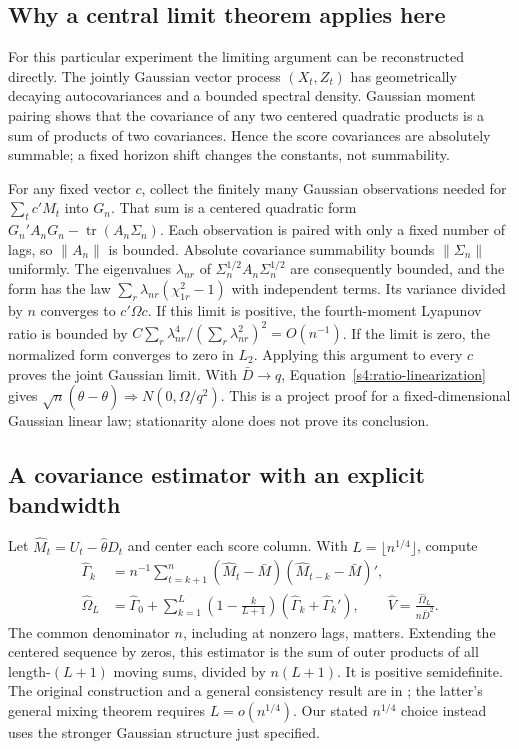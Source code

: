 \subsection{Why a central limit theorem applies here}
For this particular experiment the limiting argument can be reconstructed
directly. The jointly Gaussian vector process $(X_t,Z_t)$ has geometrically
decaying autocovariances and a bounded spectral density. Gaussian moment
pairing shows that the covariance of any two centered quadratic products
is a sum of products of two covariances. Hence the score covariances are
absolutely summable; a fixed horizon shift changes the constants, not
summability.

For any fixed vector $c$, collect the finitely many Gaussian observations
needed for $\sum_tc'M_t$ into $G_n$. That sum is a centered quadratic
form $G_n'A_nG_n-\operatorname{tr}(A_n\Sigma_n)$. Each observation is
paired with only a fixed number of lags, so $\|A_n\|$ is bounded.
Absolute covariance summability bounds $\|\Sigma_n\|$ uniformly. The
eigenvalues $\lambda_{nr}$ of
$\Sigma_n^{1/2}A_n\Sigma_n^{1/2}$ are consequently bounded, and the form
has the law $\sum_r\lambda_{nr}(\chi_{1r}^2-1)$ with independent terms.
Its variance divided by $n$ converges to $c'\Omega c$. If this limit is
positive, the fourth-moment Lyapunov ratio is bounded by
$C\sum_r\lambda_{nr}^4/(\sum_r\lambda_{nr}^2)^2=O(n^{-1})$.
If the limit is zero, the normalized form converges to zero in $L_2$.
Applying this argument to every $c$ proves the joint Gaussian limit.
With $\bar D\to q$, Equation~\eqref{s4:ratio-linearization} gives
$\sqrt n(\widehat\theta-\theta)\Rightarrow N(0,\Omega/q^2)$.
This is a project proof for a fixed-dimensional Gaussian linear law;
stationarity alone does not prove its conclusion.

\subsection{A covariance estimator with an explicit bandwidth}
Let $\widehat M_t=U_t-\widehat\theta D_t$ and center each score column.
With $L=\lfloor n^{1/4}\rfloor$, compute
\begin{align}
 \widehat\Gamma_k&=n^{-1}\sum_{t=k+1}^n
    (\widehat M_t-\bar M)(\widehat M_{t-k}-\bar M)',\nonumber\\
 \widehat\Omega_L&=\widehat\Gamma_0+
   \sum_{k=1}^L\left(1-\frac{k}{L+1}\right)
       (\widehat\Gamma_k+\widehat\Gamma_k'),\qquad
 \widehat V=\frac{\widehat\Omega_L}{n\bar D^2}.
 \label{s4:bartlett}
\end{align}
The common denominator $n$, including at nonzero lags, matters. Extending
the centered sequence by zeros, this estimator is the sum of outer
products of all length-$(L+1)$ moving sums, divided by $n(L+1)$. It is
positive semidefinite. The original construction and a general consistency
result are in \citet[equation (5), Theorems 1--2]{newey1986}; the latter's
general mixing theorem requires $L=o(n^{1/4})$. Our stated $n^{1/4}$
choice instead uses the stronger Gaussian structure just specified.

